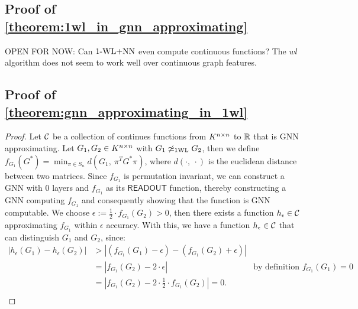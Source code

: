 \subsection{Proof of \cref{theorem:1wl_in_gnn_approximating}}
OPEN FOR NOW: Can $\text{1-WL+NN}$ even compute continuous functions? The $wl$ algorithm does not seem to work well over continuous graph features.

\subsection{Proof of \cref{theorem:gnn_approximating_in_1wl}}
\begin{proof}
    Let $\mathcal{C}$ be a collection of continues functions from $K^{n \times n}$ to $\mathbb{R}$ that is GNN approximating. Let $G_1, G_2 \in K^{n \times n}$ with $G_1 \not\simeq_{\text{1WL}} G_2$, then we define $f_{G_1}(G^*) = \min_{\pi \in S_n} d(G_1, \  \pi^T G^* \pi)$, where $d(\cdot, \ \cdot)$ is the euclidean distance between two matrices. Since $f_{G_1}$ is permutation invariant, we can construct a GNN with $0$ layers and $f_{G_1}$ as its $\textsf{READOUT}$ function, thereby constructing a GNN computing $f_{G_1}$ and consequently showing that the function is GNN computable.
    We choose $\epsilon := \frac{1}{2} \cdot f_{G_1}(G_2) > 0$, then there exists a function $h_\epsilon \in \mathcal{C}$ approximating $f_{G_1}$ within $\epsilon$ accuracy. With this, we have a function $h_\epsilon \in \mathcal{C}$ that can distinguish $G_1$ and $G_2$, since:
    \begin{align*}
        | h_\epsilon(G_1) - h_\epsilon(G_2)| &> | (f_{G_1}(G_1) - \epsilon) - (f_{G_1}(G_2) + \epsilon)|\\
        &= |f_{G_1}(G_2) -2 \cdot \epsilon| \quad&\text{by definition $f_{G_1}(G_1) = 0$}\\
        &= |f_{G_1}(G_2) -2 \cdot \frac{1}{2} \cdot f_{G_1}(G_2)| = 0.\\
    \end{align*}
\end{proof}
\newpage